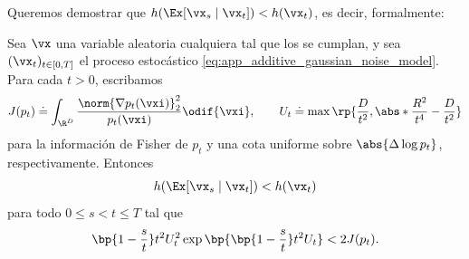 \documentclass[../../book-main_es.tex]{subfiles}
\begin{document}
Queremos demostrar que \(h(\Ex[\vx_{s} \mid \vx_{t}]) < h(\vx_{t})\),
es decir, formalmente:
\begin{theorem}\label{thm:conditioning_reduces_entropy}
    Sea \(\vx\) una variable aleatoria cualquiera tal que los
    se cumplan, y sea \((\vx_{t})_{t \in [0, T]}\) el proceso estocástico
    \eqref{eq:app_additive_gaussian_noise_model}. Para cada
    \(t > 0\), escribamos
    \begin{equation}
        J(p_{t}) \doteq
        \int_{\R^{D}}\frac{\norm{\nabla
        p_{t}(\vxi)}_{2}^{2}}{p_{t}(\vxi)}\odif{\vxi}, \qquad
        U_{t} \doteq \max\rp{\frac{D}{t^{2}},
        \abs*{\frac{R^{2}}{t^{4}} - \frac{D}{t^{2}}}}
    \end{equation}
    para la información de Fisher de \(p_{t}\) y una cota uniforme
    sobre \(\abs{\Delta \log p_{t}}\), respectivamente. Entonces
    \begin{equation}
        h(\Ex[\vx_{s} \mid \vx_{t}]) < h(\vx_{t})
    \end{equation}
    para todo \(0 \leq s < t \leq T\) tal que
    \begin{equation}\label{eq:conditioning_entropy_condition}
        \bp{1 - \frac{s}{t}}t^{2}U_{t}^{2}
        \exp\bp{\bp{1 - \frac{s}{t}}t^{2}U_{t}} < 2J(p_{t}).
    \end{equation}
\end{theorem}
\end{document}
